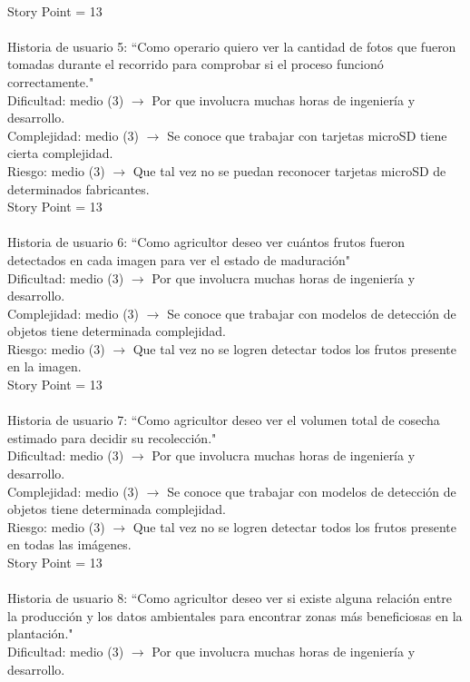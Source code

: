 \documentclass[
11pt, %
]{charter}
\begin{document}
\\
Story Point = 13
\\
\\
Historia de usuario 5: “Como operario quiero ver la cantidad de fotos que fueron tomadas durante el recorrido para comprobar si el proceso funcionó correctamente."
\\
Dificultad: medio (3) $\rightarrow$ Por que involucra muchas horas de ingeniería y desarrollo.
\\
Complejidad: medio (3) $\rightarrow$ Se conoce que trabajar con tarjetas microSD tiene cierta complejidad.
\\
Riesgo: medio (3) $\rightarrow$ Que tal vez no se puedan reconocer tarjetas microSD de determinados fabricantes.
\\
Story Point = 13
\\
\\
Historia de usuario 6: “Como agricultor deseo ver cuántos frutos fueron detectados en cada imagen para ver el estado de maduración"
\\
Dificultad: medio (3) $\rightarrow$ Por que involucra muchas horas de ingeniería y desarrollo.
\\
Complejidad: medio (3) $\rightarrow$ Se conoce que trabajar con modelos de detección de objetos tiene determinada complejidad.
\\
Riesgo: medio (3) $\rightarrow$ Que tal vez no se logren detectar todos los frutos presente en la imagen.
\\
Story Point = 13
\\
\\
Historia de usuario 7: “Como agricultor deseo ver el volumen total de cosecha estimado para decidir su recolección."
\\
Dificultad: medio (3) $\rightarrow$ Por que involucra muchas horas de ingeniería y desarrollo.
\\
Complejidad: medio (3) $\rightarrow$ Se conoce que trabajar con modelos de detección de objetos tiene determinada complejidad.
\\
Riesgo: medio (3) $\rightarrow$ Que tal vez no se logren detectar todos los frutos presente en todas las imágenes.
\\
Story Point = 13
\\
\\
Historia de usuario 8: “Como agricultor deseo ver si existe alguna relación entre la producción y los datos ambientales para encontrar zonas más beneficiosas en la plantación."
\\
Dificultad: medio (3) $\rightarrow$ Por que involucra muchas horas de ingeniería y desarrollo.
\end{document}

